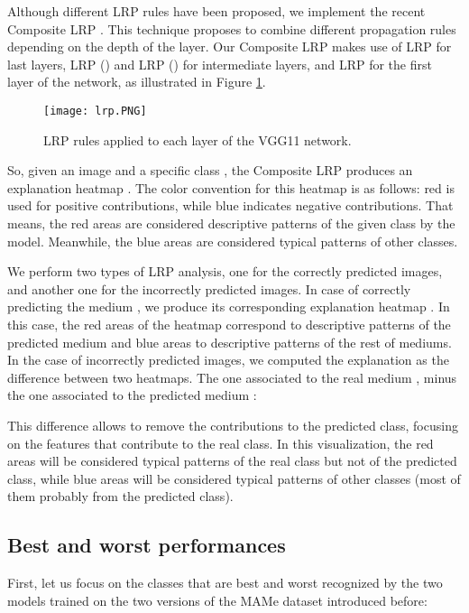 \documentclass{article}
\begin{document}
Although different LRP rules have been proposed, we implement the recent Composite LRP \citep{overview}. This technique proposes to combine different propagation rules depending on the depth of the layer. Our Composite LRP makes use of LRP for last layers, LRP () and LRP () for intermediate layers, and LRP for the first layer of the network, as illustrated in Figure \ref{fig:lrp}.

\begin{figure}[t!]
    \centering
    \texttt{[image: lrp.PNG]}
    \caption{LRP rules applied to each layer of the VGG11 network.}
    \label{fig:lrp}
\end{figure}

So, given an image  and a specific class , the Composite LRP produces an explanation heatmap . The color convention for this heatmap is as follows: red is used for positive contributions, while blue indicates negative contributions. That means, the red areas are considered descriptive patterns of the given class by the model. Meanwhile, the blue areas are considered typical patterns of other classes.

We perform two types of LRP analysis, one for the correctly predicted images, and another one for the incorrectly predicted images. In case of correctly predicting the medium , we produce its corresponding explanation heatmap . In this case, the red areas of the heatmap correspond to descriptive patterns of the predicted medium  and blue areas to descriptive patterns of the rest of mediums. In the case of incorrectly predicted images, we computed the explanation as the difference between two heatmaps. The one associated to the real medium , minus the one associated to the predicted medium :


This difference allows to remove the contributions to the predicted class, focusing on the features that contribute to the real class. In this visualization, the red areas will be considered typical patterns of the real class but not of the predicted class, while blue areas will be considered typical patterns of other classes (most of them probably from the predicted class).

\subsection{Best and worst performances} \label{sec:exp_crc}

First, let us focus on the classes that are best and worst recognized by the two models trained on the two versions of the MAMe dataset introduced before:
\end{document}
